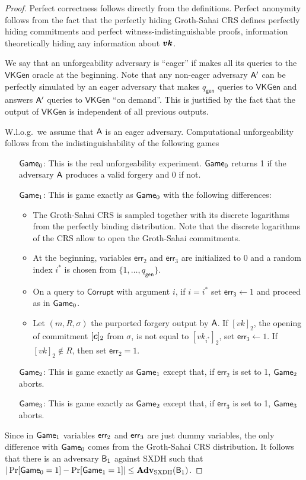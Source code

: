 \begin{proof}
Perfect correctness follows directly from the definitions. Perfect anonymity follows from the fact that the perfectly hiding Groth-Sahai CRS defines perfectly hiding commitments and perfect witness-indistinguishable proofs, information theoretically hiding any information about ${\boldsymbol{vk}}$.

We say that an unforgeability adversary is ``eager'' if  makes all its queries to the $\mathsf{VKGen}$ oracle at the beginning. Note that any non-eager adversary $\mathsf{A}'$ can be perfectly simulated  by an eager adversary that makes ${q_\mathsf{gen}}$ queries to $\mathsf{VKGen}$ and answers $\mathsf{A}'$ queries to $\mathsf{VKGen}$ ``on demand''. This is justified by the fact that the output of $\mathsf{VKGen}$ is independent of all previous outputs.

W.l.o.g.~we assume that $\mathsf{A}$ is an eager adversary. Computational unforgeability follows from the indistinguishability of the following games
\begin{itemize}
\item[$\mathsf{Game}_0$:] This is the real unforgeability experiment. $\mathsf{Game}_0$ returns 1 if the adversary $\mathsf{A}$ produces a valid forgery and 0 if not.
\item[$\mathsf{Game}_1$:] This is game exactly as $\mathsf{Game}_0$ with the following differences: 
    \begin{itemize}
    \item The Groth-Sahai CRS is sampled together with its discrete logarithms from the perfectly binding distribution. Note that the discrete logarithms of the CRS allow to open the Groth-Sahai commitments.
    \item At the beginning, variables $\mathsf{err}_2$ and $\mathsf{err}_3$ are initialized to $0$ and a random index $i^*$ is chosen from $\{1,\ldots, q_\mathsf{gen}\}$.
    \item On a query to $\mathsf{Corrupt}$ with argument $i$, if $i=i^*$ set $\mathsf{err_3}\gets 1$ and proceed as in $\mathsf{Game}_0$.
    \item Let $(m,R,\sigma)$ the purported forgery output by $\mathsf{A}$. If $[vk]_2$, the opening of commitment $[{\boldsymbol{c}}]_2$ from $\sigma$, is not equal to $[vk_{i^*}]_2$,  set $\mathsf{err}_3\gets 1$. If $[vk]_2\notin R$, then set $\mathsf{err}_2=1$.
    \end{itemize}
\item[$\mathsf{Game}_2$:] This is game exactly as $\mathsf{Game}_1$ except that, if $\mathsf{err}_2$ is set to 1, $\mathsf{Game}_2$ aborts.
\item[$\mathsf{Game}_3$:] This is game exactly as $\mathsf{Game}_2$ except that, if $\mathsf{err}_3$ is set to 1, $\mathsf{Game}_3$ aborts. 
\end{itemize}
Since in $\mathsf{Game}_1$ variables $\mathsf{err}_2$ and $\mathsf{err}_3$ are just dummy variables, the only difference with $\mathsf{Game}_0$ comes from the Groth-Sahai CRS distribution. It follows that there is an adversary $\mathsf{B}_{1}$ against SXDH such that $|\Pr[\mathsf{Game}_0=1]-\Pr[\mathsf{Game}_1=1]|\leq \mathbf{Adv}_{\mathrm{SXDH}}(\mathsf{B}_{1})$.


\end{proof}
